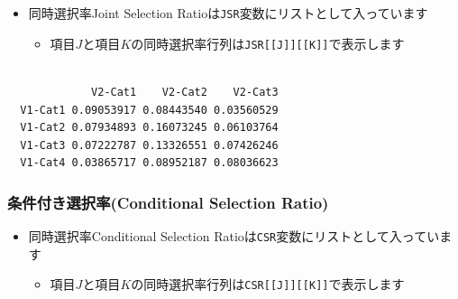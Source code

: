 \documentclass[
  a4paper,
]{ltjsbook}
\newenvironment{Shaded}{\begin{snugshade}}{\end{snugshade}}
\newcommand{\DecValTok}[1]{\textcolor[rgb]{0.68,0.00,0.00}{#1}}
\newcommand{\NormalTok}[1]{\textcolor[rgb]{0.00,0.23,0.31}{#1}}
\newcommand{\SpecialCharTok}[1]{\textcolor[rgb]{0.37,0.37,0.37}{#1}}
\providecommand{\tightlist}{%
  \setlength{\itemsep}{0pt}\setlength{\parskip}{0pt}}\usepackage{longtable,booktabs,array}
\begin{document}
\begin{itemize}
\tightlist
\item
  同時選択率Joint Selection
  Ratioは\texttt{JSR}変数にリストとして入っています

  \begin{itemize}
  \tightlist
  \item
    項目\(J\)と項目\(K\)の同時選択率行列は\texttt{JSR{[}{[}J{]}{]}{[}{[}K{]}{]}}で表示します
  \end{itemize}
\end{itemize}

\begin{Shaded}
\end{Shaded}

\begin{verbatim}
         
             V2-Cat1    V2-Cat2    V2-Cat3
  V1-Cat1 0.09053917 0.08443540 0.03560529
  V1-Cat2 0.07934893 0.16073245 0.06103764
  V1-Cat3 0.07222787 0.13326551 0.07426246
  V1-Cat4 0.03865717 0.08952187 0.08036623
\end{verbatim}

\subsubsection{条件付き選択率(Conditional Selection
Ratio)}\label{ux6761ux4ef6ux4ed8ux304dux9078ux629eux7387conditional-selection-ratio}

\begin{itemize}
\tightlist
\item
  同時選択率Conditional Selection
  Ratioは\texttt{CSR}変数にリストとして入っています

  \begin{itemize}
  \tightlist
  \item
    項目\(J\)と項目\(K\)の同時選択率行列は\texttt{CSR{[}{[}J{]}{]}{[}{[}K{]}{]}}で表示します
  \end{itemize}
\end{itemize}

\begin{Shaded}
\end{Shaded}
\end{document}
